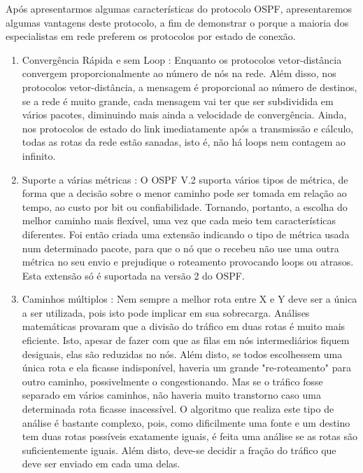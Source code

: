 \documentclass[12pt,a4paper]{report}
\begin{document}
Ap\'os apresentarmos algumas caracter\'isticas do protocolo OSPF, apresentaremos algumas vantagens deste protocolo, a fim de demonstrar o porque a maioria dos especialistas em rede preferem os protocolos por estado de conex\~ao.

\begin{enumerate}
\item Converg\^encia R\'apida e sem Loop : Enquanto os protocolos vetor-dist\^ancia convergem proporcionalmente ao número de n\'os na rede. Al\'em disso, nos protocolos vetor-dist\^ancia, a mensagem \'e proporcional ao n\'umero de destinos, se a rede \'e muito grande, cada mensagem vai ter que ser subdividida em v\'arios pacotes, diminuindo mais ainda a velocidade de converg\^encia. Ainda, nos protocolos de estado do link imediatamente ap\'os a transmiss\~ao e c\'alculo, todas as rotas da rede est\~ao sanadas, isto \'e, n\~ao h\'a loops nem contagem ao infinito.
\item Suporte a v\'arias m\'etricas : O OSPF V.2 suporta v\'arios tipos de m\'etrica, de forma que a decis\~ao sobre o menor caminho pode ser tomada em rela\c{c}\~ao ao tempo, ao custo por bit ou confiabilidade. Tornando, portanto, a escolha do melhor caminho mais flex\'ivel, uma vez que cada meio tem caracter\'isticas diferentes. Foi ent\~ao criada uma extens\~ao indicando o tipo de m\'etrica usada num determinado pacote, para que o n\'o que o recebeu n\~ao use uma outra m\'etrica no seu envio e prejudique o roteamento provocando loops ou atrasos. Esta extens\~ao s\'o \'e suportada na vers\~ao 2 do OSPF.
\item Caminhos m\'ultiplos : Nem sempre a melhor rota entre X e Y deve ser a \'unica a ser utilizada, pois isto pode implicar em sua sobrecarga. An\'alises matem\'aticas provaram que a divis\~ao do tr\'afico em duas rotas \'e muito mais eficiente. Isto, apesar de fazer com que as filas em n\'os intermedi\'arios fiquem desiguais, elas s\~ao reduzidas no n\'os. Al\'em disto, se todos escolhessem uma \'unica rota e ela ficasse indispon\'ivel, haveria um grande "re-roteamento" para outro caminho, possivelmente o congestionando. Mas se o tr\'afico fosse separado em v\'arios caminhos, n\~ao haveria muito transtorno caso uma determinada rota ficasse inacess\'ivel. O algoritmo que realiza este tipo de análise \'e bastante complexo, pois, como dificilmente uma fonte e um destino tem duas rotas poss\'iveis exatamente iguais, \'e feita uma an\'alise se as rotas s\~ao suficientemente iguais. Al\'em disto, deve-se decidir a fra\c{c}\~ao do tr\'afico que deve ser enviado em cada uma delas.
\end{enumerate}
\end{document}
